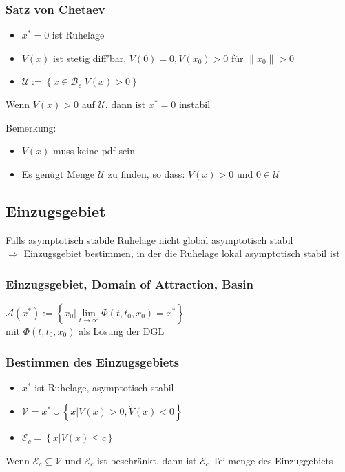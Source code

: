 \documentclass[german]{latex4ei/latex4ei_sheet}
\begin{document}
\subsubsection*{Satz von Chetaev}
\begin{itemize}
  \item $x^* = 0$ ist Ruhelage
  \item $V(x)$ ist stetig diff'bar, $V(0)=0, V(x_0)>0$ für $\|x_0\| > 0$
  \item $\mathcal{U} := \left\{ x \in \mathcal{B}_\varepsilon | V(x) > 0 \right\}$
\end{itemize}
Wenn $\dot{V}(x) > 0$ auf $\mathcal{U}$, dann ist $x^*=0$ instabil

Bemerkung:\\
\begin{itemize}
  \item $V(x)$ muss keine pdf sein
  \item Es genügt Menge $\mathcal{U}$ zu finden, so dass: $V(x) > 0$ und $0 \in \mathcal{U}$
\end{itemize}


\subsection{Einzugsgebiet}
Falls asymptotisch stabile Ruhelage nicht global asymptotisch stabil \\
$\Rightarrow$ Einzugsgebiet bestimmen, in der die Ruhelage lokal asymptotisch stabil ist

\subsubsection*{Einzugsgebiet, Domain of Attraction, Basin}
$\mathcal{A}(x^*) := \left\{ x_0 | \lim\limits_{t \rightarrow \infty} \Phi(t,t_0,x_0) = x^* \right\}$ \\
mit $\Phi(t,t_0,x_0)$ als Lösung der DGL

\subsubsection*{Bestimmen des Einzugsgebiets}
\begin{itemize}
  \item $x^*$ ist Ruhelage, asymptotisch stabil
  \item $\mathcal{V} = {x^*} \cup \left\{ x | V(x) > 0, \dot{V}(x) < 0 \right\}$
  \item $\mathcal{E}_c = \left\{ x | V(x) \leq c \right\}$
\end{itemize}
Wenn $\mathcal{E}_c \subseteq \mathcal{V}$ und $\mathcal{E}_c$ ist beschränkt, dann ist $\mathcal{E}_c$ Teilmenge des Einzuggebiets
\end{document}
